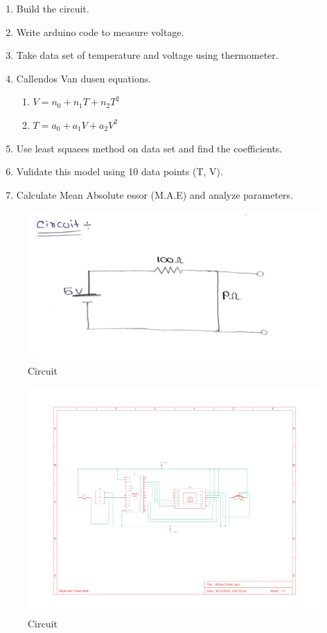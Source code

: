 \documentclass[journal]{IEEEtran}
\begin{document}
\begin{enumerate}
    \item Build the circuit.
    \item Write arduino code to measure voltage.
    \item Take data set of temperature and voltage using thermometer.
    \item Callendos Van dusen equations.
    \begin{enumerate}
        \item $V = n_0 + n_1T + n_2T^2$
        \item $T = a_0 + a_1V + a_2V^2$
    \end{enumerate}
    \item Use least squaees method on data set and find the coefficients.
    \item Vulidate this model using 10 data points (T, V).
    \item Calculate Mean Absolute essor (M.A.E) and analyze parameters.
\end{enumerate}
\begin{figure}[h]
    \centering
    \includegraphics[width=0.5\linewidth]{figs/Screenshot 2025-11-01 at 00-44-18 Adobe Scan 31 Oct 2025 (1) - Adobe cloud storage.png}
    \caption{Circuit}
    \label{fig:placeholde}
\end{figure}
\begin{figure}[h]
    \centering
    \includegraphics[width=0.9\linewidth]{figs/circuit.pdf}
    \caption{Circuit}
    \label{fig:placeholder}
\end{figure}
\end{document}
